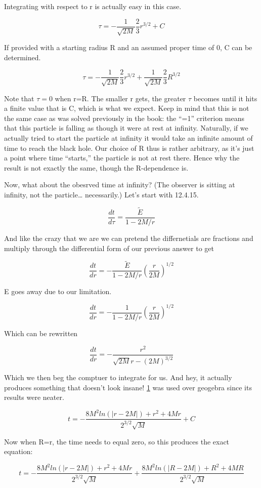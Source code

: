 \documentclass[landscape,letterpaper,10pt,english]{article}
\begin{document}
Integrating with respect to r is actually easy in this case.

\[ \tau = -\frac{1}{\sqrt{2M}}  \frac23 r^{3/2} + C\]

    If provided with a starting radius R and an assumed proper time of 0, C
can be determined.

\[ \tau = -\frac{1}{\sqrt{2M}}  \frac23 r^{3/2} + \frac{1}{\sqrt{2M}}  \frac23 R^{3/2}\]

Note that \(\tau=0\) when r=R. The smaller r gets, the greater \(\tau\)
becomes until it hits a finite value that is C, which is what we expect.
Keep in mind that this is not the same case as was solved previously in
the book: the ``=1'' criterion means that this particle is falling as
though it were at rest at infinity. Naturally, if we actually tried to
start the particle at infinity it would take an infinite amount of time
to reach the black hole. Our choice of R thus is rather arbitrary, as
it's just a point where time ``starts,'' the particle is not at rest
there. Hence why the result is not exactly the same, though the
R-dependence is.

    Now, what about the obesrved time at infinity? (The observer is sitting
at infinity, not the particle\ldots{} necessarily.) Let's start with
12.4.15.

\[ \frac{dt}{d\tau} = \frac{\tilde E}{1-2M/r} \]

And like the crazy that we are we can pretend the differnetials are
fractions and multiply through the differential form of our previous
answer to get

\[ \frac{dt}{dr} = -\frac{\tilde E}{1-2M/r}\left( \frac{r}{2M} \right)^{1/2} \]

E goes away due to our limitation.

\[ \frac{dt}{dr} = -\frac{1}{1-2M/r}\left( \frac{r}{2M} \right)^{1/2} \]

Which can be rewritten

\[ \frac{dt}{dr} = -\frac{r^2}{\sqrt{2M}r-(2M)^{3/2}} \]

Which we then beg the comptuer to integrate for us. And hey, it actually
produces something that doesn't look insane! \hyperref[1]{1} was used
over geogebra since its results were neater.

\[ t = - \frac{ 8M^2 ln(|r-2M|) + r^2 + 4Mr }{2^{3/2} \sqrt{M}} + C \]

    Now when R=r, the time needs to equal zero, so this produces the exact
equation:

\[ t = - \frac{ 8M^2 ln(|r-2M|) + r^2 + 4Mr }{2^{3/2} \sqrt{M}} + \frac{ 8M^2 ln(|R-2M|) + R^2 + 4MR }{2^{3/2} \sqrt{M}} \]
\end{document}
